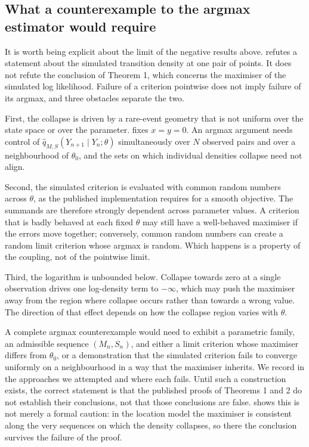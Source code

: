 \documentclass[11pt]{article}
\theoremstyle{definition}
\newcommand{\thetao}{\theta_0}
\begin{document}
\subsection{What a counterexample to the argmax estimator would require}\label{sec:argmax_gap}

It is worth being explicit about the limit of the negative results above.  refutes a statement about the simulated transition density at one pair of points. It does not refute the conclusion of Theorem 1, which concerns the maximiser of the simulated log likelihood. Failure of a criterion pointwise does not imply failure of its argmax, and three obstacles separate the two.

First, the collapse is driven by a rare-event geometry that is not uniform over the state space or over the parameter.  fixes $x=y=0$. An argmax argument needs control of $\widehat q_{M,S}(Y_{n+1}\mid Y_n;\theta)$ simultaneously over $N$ observed pairs and over a neighbourhood of $\thetao$, and the sets on which individual densities collapse need not align.

Second, the simulated criterion is evaluated with common random numbers across $\theta$, as the published implementation requires for a smooth objective. The summands are therefore strongly dependent across parameter values. A criterion that is badly behaved at each fixed $\theta$ may still have a well-behaved maximiser if the errors move together; conversely, common random numbers can create a random limit criterion whose argmax is random. Which happens is a property of the coupling, not of the pointwise limit.

Third, the logarithm is unbounded below. Collapse towards zero at a single observation drives one log-density term to $-\infty$, which may push the maximiser away from the region where collapse occurs rather than towards a wrong value. The direction of that effect depends on how the collapse region varies with $\theta$.

A complete argmax counterexample would need to exhibit a parametric family, an admissible sequence $(M_n,S_n)$, and either a limit criterion whose maximiser differs from $\thetao$, or a demonstration that the simulated criterion fails to converge uniformly on a neighbourhood in a way that the maximiser inherits. We record in  the approaches we attempted and where each fails. Until such a construction exists, the correct statement is that the published proofs of Theorems 1 and 2 do not establish their conclusions, not that those conclusions are false.  shows this is not merely a formal caution: in the location model the maximiser is consistent along the very sequences on which the density collapses, so there the conclusion survives the failure of the proof.
\end{document}
